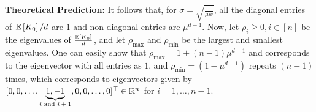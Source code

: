 \textbf{Theoretical Prediction:} It follows that,  for $\sigma=\sqrt{\frac{1}{\mu w}}$, all the diagonal entries of $\mathbb{E}\left[K_0\right]/d$ are $1$ and non-diagonal entries are $\mu^{d-1}$. Now, let $\rho_i\geq 0,i \in [n]$ be the eigenvalues of $\frac{\mathbb{E}\left[K_0\right]}{d}$, and let $\rho_{\max}$ and $\rho_{\min}$ be the largest and smallest eigenvalues.  One can easily show that $\rho_{\max}=1+(n-1)\mu^{d-1}$ and corresponds to the eigenvector with all entries as $1$, and $\rho_{\min}=(1-\mu^{d-1})$ repeats $(n-1)$ times, which corresponds to eigenvectors given by $[0, 0, \ldots, \underbrace{1, -1}_{\text{$i$ and $i+1$}}, 0,0,\ldots, 0]^\top \in \mathbb{R}^n$ for $i=1,\ldots,n-1$.\hfill\\
\begin{figure}
\end{figure}
